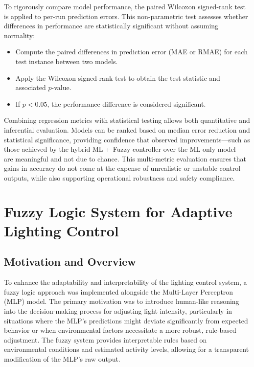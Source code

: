 \documentclass[conference]{IEEEtran}
\begin{document}
To rigorously compare model performance, the paired Wilcoxon signed-rank test is applied to per-run prediction errors. This non-parametric test assesses whether differences in performance are statistically significant without assuming normality:

\begin{itemize}
    \item Compute the paired differences in prediction error (MAE or RMAE) for each test instance between two models.
    \item Apply the Wilcoxon signed-rank test to obtain the test statistic and associated $p$-value.
    \item If $p < 0.05$, the performance difference is considered significant.
\end{itemize}

Combining regression metrics with statistical testing allows both quantitative and inferential evaluation. Models can be ranked based on median error reduction and statistical significance, providing confidence that observed improvements—such as those achieved by the hybrid ML + Fuzzy controller over the ML-only model—are meaningful and not due to chance. This multi-metric evaluation ensures that gains in accuracy do not come at the expense of unrealistic or unstable control outputs, while also supporting operational robustness and safety compliance.

\section{Fuzzy Logic System for Adaptive Lighting Control}

\subsection{Motivation and Overview}
To enhance the adaptability and interpretability of the lighting control system, a fuzzy logic approach was implemented alongside the Multi-Layer Perceptron (MLP) model. The primary motivation was to introduce human-like reasoning into the decision-making process for adjusting light intensity, particularly in situations where the MLP's predictions might deviate significantly from expected behavior or when environmental factors necessitate a more robust, rule-based adjustment. The fuzzy system provides interpretable rules based on environmental conditions and estimated activity levels, allowing for a transparent modification of the MLP's raw output.
\end{document}

